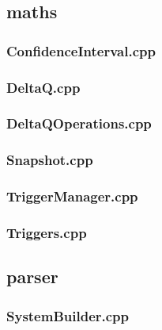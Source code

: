 \subsection*{maths}

\subsubsection*{ConfidenceInterval.cpp}


\subsubsection*{DeltaQ.cpp}


\subsubsection*{DeltaQOperations.cpp}


\subsubsection*{Snapshot.cpp}


\subsubsection*{TriggerManager.cpp}


\subsubsection*{Triggers.cpp}


\subsection*{parser}

\subsubsection*{SystemBuilder.cpp}


